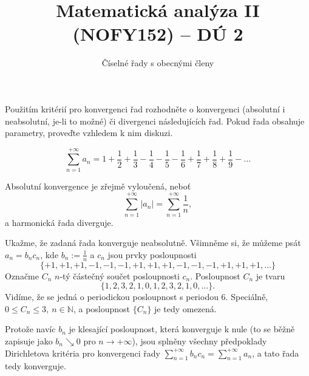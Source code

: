 \documentclass[answers]{exam}
\title{\vspace{-3ex}Matematická analýza II (NOFY152) – DÚ 2}
\author{Číselné řady s obecnými členy}
\date{\vspace{-5ex}}
\begin{document}
\maketitle

Použitím kritérií pro konvergenci řad rozhodněte o konvergenci (absolutní i neabsolutní, je-li to možné) či divergenci následujících řad. Pokud řada obsahuje parametry, proveďte vzhledem k nim diskuzi.

\begin{questions}
  \question
  \begin{equation*}
    \sum_{n = 1}^{+\infty}
    a_n
    =
    1 + \frac{1}{2} + \frac{1}{3} - \frac{1}{4} - \frac{1}{5} - \frac{1}{6} + \frac{1}{7} + \frac{1}{8} + \frac{1}{9} - \dots
  \end{equation*}
  
  \begin{solution}
		Absolutní konvergence je zřejmě vyloučená, neboť
		\begin{equation*}
    \sum_{n = 1}^{+\infty}
    \left| a_n \right|
    =
    \sum_{n = 1}^{+\infty}
    \frac{1}{n},		
		\end{equation*}
		a harmonická řada diverguje.
		
		Ukažme, že zadaná řada konverguje neabsolutně. Všimněme si, že můžeme psát $a_n = b_n c_n$, kde $b_n:=\frac{1}{n}$ a $c_n$ jsou prvky posloupnosti
		\begin{equation*}
			\{ +1, +1, +1, -1, -1, -1, +1, +1, +1, -1, -1, -1, +1, +1, +1, \ldots \}
		\end{equation*}
		Označme $C_n$ $n$-tý částečný součet posloupnosti $c_n$. Posloupnost $C_n$ je tvaru
		\begin{equation*}
			\{ 1,2,3,2,1,0,1,2,3,2,1,0,\ldots \}.
		\end{equation*}
		Vid\'ime, \v ze se jedn\'a o periodickou posloupnost s periodou 6. Speci\'aln\v e, $0\le C_n\le3,\ n\in\mathbb N$, a posloupnost $\{C_n\}$ je tedy omezen\'a.
		
		Protože navíc $b_n$ je klesaj\'ic\'i posloupnost, kter\'a konverguje k nule (to se b\v e\v zn\v e zapisuje jako $b_n\searrow0$ pro $n\to+\infty$), jsou spln\v eny všechny p\v redpoklady Dirichletova krit\'eria pro konvergenci \v rady $\sum_{n=1}^{+\infty} b_nc_n = \sum_{n=1}^{+\infty} a_n$, a tato \v rada tedy konverguje. 
		

\end{solution}
\end{questions}
\end{document}
